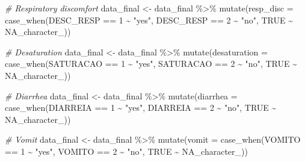 \documentclass[
]{article}
\newenvironment{Shaded}{\begin{snugshade}}{\end{snugshade}}
\newcommand{\AttributeTok}[1]{\textcolor[rgb]{0.77,0.63,0.00}{#1}}
\newcommand{\CommentTok}[1]{\textcolor[rgb]{0.56,0.35,0.01}{\textit{#1}}}
\newcommand{\ConstantTok}[1]{\textcolor[rgb]{0.00,0.00,0.00}{#1}}
\newcommand{\DecValTok}[1]{\textcolor[rgb]{0.00,0.00,0.81}{#1}}
\newcommand{\FunctionTok}[1]{\textcolor[rgb]{0.00,0.00,0.00}{#1}}
\newcommand{\NormalTok}[1]{#1}
\newcommand{\OtherTok}[1]{\textcolor[rgb]{0.56,0.35,0.01}{#1}}
\newcommand{\SpecialCharTok}[1]{\textcolor[rgb]{0.00,0.00,0.00}{#1}}
\newcommand{\StringTok}[1]{\textcolor[rgb]{0.31,0.60,0.02}{#1}}
\begin{document}
\begin{Shaded}
\begin{Highlighting}[]
\CommentTok{\# Respiratory discomfort}
\NormalTok{data\_final }\OtherTok{\textless{}{-}}\NormalTok{  data\_final }\SpecialCharTok{\%\textgreater{}\%}
  \FunctionTok{mutate}\NormalTok{(}\AttributeTok{resp\_disc =} \FunctionTok{case\_when}\NormalTok{(DESC\_RESP }\SpecialCharTok{==} \DecValTok{1} \SpecialCharTok{\textasciitilde{}} \StringTok{"yes"}\NormalTok{,}
\NormalTok{                               DESC\_RESP }\SpecialCharTok{==} \DecValTok{2} \SpecialCharTok{\textasciitilde{}} \StringTok{"no"}\NormalTok{,}
                               \ConstantTok{TRUE} \SpecialCharTok{\textasciitilde{}} \ConstantTok{NA\_character\_}\NormalTok{))}

\CommentTok{\# Desaturation}
\NormalTok{data\_final }\OtherTok{\textless{}{-}}\NormalTok{  data\_final }\SpecialCharTok{\%\textgreater{}\%}
  \FunctionTok{mutate}\NormalTok{(}\AttributeTok{desaturation =} \FunctionTok{case\_when}\NormalTok{(SATURACAO }\SpecialCharTok{==} \DecValTok{1} \SpecialCharTok{\textasciitilde{}} \StringTok{"yes"}\NormalTok{,}
\NormalTok{                                  SATURACAO }\SpecialCharTok{==} \DecValTok{2} \SpecialCharTok{\textasciitilde{}} \StringTok{"no"}\NormalTok{,}
                                  \ConstantTok{TRUE} \SpecialCharTok{\textasciitilde{}} \ConstantTok{NA\_character\_}\NormalTok{))}

\CommentTok{\# Diarrhea}
\NormalTok{data\_final }\OtherTok{\textless{}{-}}\NormalTok{  data\_final }\SpecialCharTok{\%\textgreater{}\%}
  \FunctionTok{mutate}\NormalTok{(}\AttributeTok{diarrhea =} \FunctionTok{case\_when}\NormalTok{(DIARREIA }\SpecialCharTok{==} \DecValTok{1} \SpecialCharTok{\textasciitilde{}} \StringTok{"yes"}\NormalTok{,}
\NormalTok{                              DIARREIA }\SpecialCharTok{==} \DecValTok{2} \SpecialCharTok{\textasciitilde{}} \StringTok{"no"}\NormalTok{,}
                              \ConstantTok{TRUE} \SpecialCharTok{\textasciitilde{}} \ConstantTok{NA\_character\_}\NormalTok{))}

\CommentTok{\# Vomit}
\NormalTok{data\_final }\OtherTok{\textless{}{-}}\NormalTok{  data\_final }\SpecialCharTok{\%\textgreater{}\%}
  \FunctionTok{mutate}\NormalTok{(}\AttributeTok{vomit =} \FunctionTok{case\_when}\NormalTok{(VOMITO }\SpecialCharTok{==} \DecValTok{1} \SpecialCharTok{\textasciitilde{}} \StringTok{"yes"}\NormalTok{,}
\NormalTok{                           VOMITO }\SpecialCharTok{==} \DecValTok{2} \SpecialCharTok{\textasciitilde{}} \StringTok{"no"}\NormalTok{,}
                           \ConstantTok{TRUE} \SpecialCharTok{\textasciitilde{}} \ConstantTok{NA\_character\_}\NormalTok{))}


\end{Highlighting}
\end{Shaded}
\end{document}
